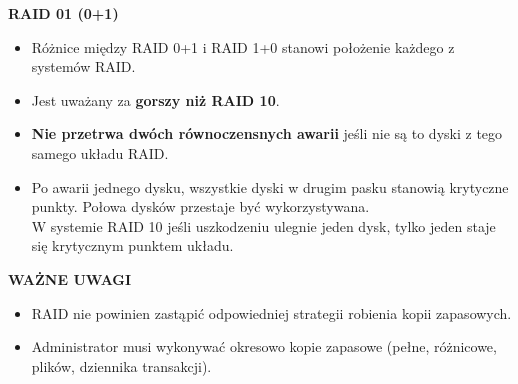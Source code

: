 \textbf{RAID 01 (0+1)}
\begin{itemize}
    \item Różnice między RAID 0+1 i RAID 1+0 stanowi położenie każdego z
          systemów RAID.
    \item Jest uważany za \textbf{gorszy niż RAID 10}.
    \item \textbf{Nie przetrwa dwóch równoczensnych awarii}
          jeśli nie są to dyski z tego samego układu RAID.
    \item Po awarii jednego dysku, wszystkie dyski w drugim pasku stanowią
          krytyczne punkty. Połowa dysków przestaje być wykorzystywana.\\
          W systemie RAID 10 jeśli uszkodzeniu ulegnie jeden dysk, tylko
          jeden staje się krytycznym punktem układu.
\end{itemize}

\begin{center}
\end{center}

\textbf{WAŻNE UWAGI}
\begin{itemize}
    \item RAID nie powinien zastąpić odpowiedniej strategii robienia kopii
          zapasowych.
    \item Administrator musi wykonywać okresowo kopie zapasowe (pełne,
          różnicowe, plików, dziennika transakcji).
\end{itemize}

